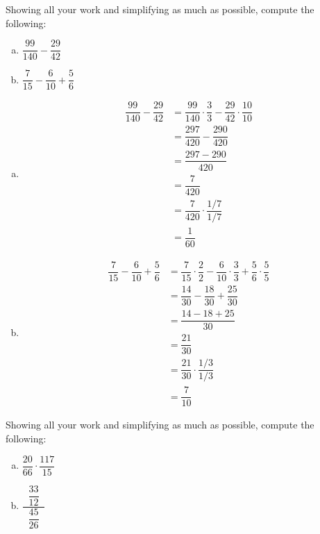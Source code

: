 \documentclass[12pt,letterpaper]{exam}
\begin{document}
\begin{questions}
\newpage
\question[5] Showing all your work and simplifying as much as possible, compute the following:
	\begin{enumerate}[(a)]
	\item $\dfrac{99}{140} - \dfrac{29}{42}$ \par\vspace{0.3cm}
	\item $\dfrac{7}{15} - \dfrac{6}{10} + \dfrac{5}{6}$
	\end{enumerate} \pspace

\sol 
\begin{enumerate}[(a)]
\item 
	\[
	\begin{aligned}
	\dfrac{99}{140} - \dfrac{29}{42}&= \dfrac{99}{140} \cdot \dfrac{3}{3} - \dfrac{29}{42} \cdot \dfrac{10}{10} \\[0.3cm]
	&= \dfrac{297}{420} - \dfrac{290}{420} \\[0.3cm]
	&= \dfrac{297 - 290}{420} \\[0.3cm]
	&= \dfrac{7}{420} \\[0.3cm]
	&= \dfrac{7}{420} \cdot \dfrac{1/7}{1/7} \\[0.3cm]
	&= \dfrac{1}{60}
	\end{aligned}
	\] \vfill

\item 
	\[
	\begin{aligned}
	\dfrac{7}{15} - \dfrac{6}{10} + \dfrac{5}{6}&= \dfrac{7}{15} \cdot \dfrac{2}{2} - \dfrac{6}{10} \cdot \dfrac{3}{3} + \dfrac{5}{6} \cdot \dfrac{5}{5} \\[0.3cm]
	&= \dfrac{14}{30} - \dfrac{18}{30} + \dfrac{25}{30} \\[0.3cm]
	&= \dfrac{14 - 18 + 25}{30} \\[0.3cm]
	&= \dfrac{21}{30} \\[0.3cm]
	&= \dfrac{21}{30} \cdot \dfrac{1/3}{1/3} \\[0.3cm]
	&= \dfrac{7}{10}
	\end{aligned}
	\]
\end{enumerate}



\newpage
\question[5] Showing all your work and simplifying as much as possible, compute the following:
	\begin{enumerate}[(a)]
	\item $\dfrac{20}{66} \cdot \dfrac{117}{15}$ \par\vspace{0.3cm}
	\item $\dfrac{\;\;\dfrac{33}{12}\;\;}{\;\;\dfrac{45}{26}\;\;}$
	\end{enumerate} \pspace


\end{questions}
\end{document}
